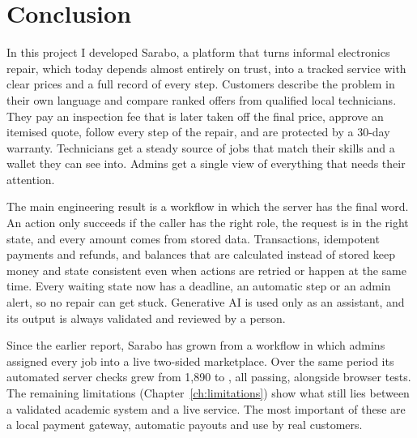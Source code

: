 \documentclass{standalone}
\begin{document}
\chapter{Conclusion}

In this project I developed Sarabo, a platform that turns informal electronics repair, which today depends almost entirely on trust, into a tracked service with clear prices and a full record of every step. Customers describe the problem in their own language and compare ranked offers from qualified local technicians. They pay an inspection fee that is later taken off the final price, approve an itemised quote, follow every step of the repair, and are protected by a 30-day warranty. Technicians get a steady source of jobs that match their skills and a wallet they can see into. Admins get a single view of everything that needs their attention.

The main engineering result is a workflow in which the server has the final word. An action only succeeds if the caller has the right role, the request is in the right state, and every amount comes from stored data. Transactions, idempotent payments and refunds, and balances that are calculated instead of stored keep money and state consistent even when actions are retried or happen at the same time. Every waiting state now has a deadline, an automatic step or an admin alert, so no repair can get stuck. Generative AI is used only as an assistant, and its output is always validated and reviewed by a person.

Since the earlier report, Sarabo has grown from a workflow in which admins assigned every job into a live two-sided marketplace. Over the same period its automated server checks grew from 1,890 to \servertestcount{}, all passing, alongside \clienttestcount{} browser tests. The remaining limitations (Chapter~\ref{ch:limitations}) show what still lies between a validated academic system and a live service. The most important of these are a local payment gateway, automatic payouts and use by real customers.
\end{document}
